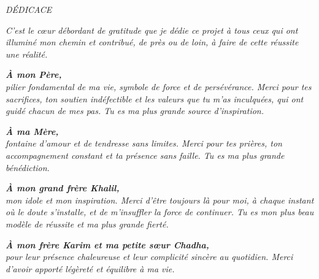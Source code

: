 \clearpage
\newpage
\thispagestyle{empty}
\vspace{0.8cm}

\begin{center}
\textit{\Large DÉDICACE}
\end{center}

\vspace{0.2cm}

\begin{center}
\textit{C'est le c\oe ur débordant de gratitude que je dédie ce projet
à tous ceux qui ont illuminé mon chemin et contribué, de près ou de loin,
à faire de cette réussite une réalité.}
\end{center}

\vspace{0.4cm}

\begin{center}
\noindent\textbf{\textit{À mon Père,}}\\
\textit{pilier fondamental de ma vie, symbole de force et de persévérance.
Merci pour tes sacrifices, ton soutien indéfectible et les valeurs que tu m'as inculquées,
qui ont guidé chacun de mes pas. Tu es ma plus grande source d'inspiration.}
\end{center}

\vspace{0.3cm}

\begin{center}
\noindent\textbf{\textit{À ma Mère,}}\\
\textit{fontaine d'amour et de tendresse sans limites.
Merci pour tes prières, ton accompagnement constant et ta présence sans faille.
Tu es ma plus grande bénédiction.}
\end{center}

\vspace{0.3cm}

\begin{center}
\noindent\textbf{\textit{À mon grand frère Khalil,}}\\
\textit{mon idole et mon inspiration. Merci d'être toujours là pour moi, à chaque instant
où le doute s'installe, et de m'insuffler la force de continuer. Tu es mon plus beau modèle
de réussite et ma plus grande fierté.}
\end{center}

\vspace{0.3cm}

\begin{center}
\noindent\textbf{\textit{À mon frère Karim et ma petite s\oe ur Chadha,}}\\
\textit{pour leur présence chaleureuse et leur complicité sincère au quotidien.
Merci d'avoir apporté légèreté et équilibre à ma vie.}
\end{center}

